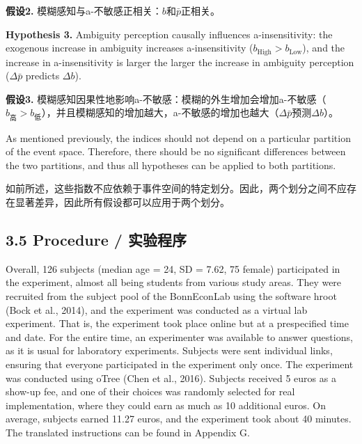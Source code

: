 \documentclass[12pt,a4paper]{article}
\newenvironment{original}
  {\par\medskip\noindent\color{black}\ignorespaces}
  {\par\medskip}
\newenvironment{translation}
  {\par\noindent\color{transblue}\ignorespaces}
  {\par\medskip\medskip}
\begin{document}
\begin{translation}
\textbf{假设2.} 模糊感知与a-不敏感正相关：$b$和$\bar{p}$正相关。
\end{translation}

\begin{original}
\textbf{Hypothesis 3.} Ambiguity perception causally influences a-insensitivity: the exogenous increase in ambiguity increases a-insensitivity ($b_{\text{High}} > b_{\text{Low}}$), and the increase in a-insensitivity is larger the larger the increase in ambiguity perception ($\Delta \bar{p}$ predicts $\Delta b$).
\end{original}

\begin{translation}
\textbf{假设3.} 模糊感知因果性地影响a-不敏感：模糊的外生增加会增加a-不敏感（$b_{\text{高}} > b_{\text{低}}$），并且模糊感知的增加越大，a-不敏感的增加也越大（$\Delta \bar{p}$预测$\Delta b$）。
\end{translation}

\begin{original}
As mentioned previously, the indices should not depend on a particular partition of the event space. Therefore, there should be no significant differences between the two partitions, and thus all hypotheses can be applied to both partitions.
\end{original}

\begin{translation}
如前所述，这些指数不应依赖于事件空间的特定划分。因此，两个划分之间不应存在显著差异，因此所有假设都可以应用于两个划分。
\end{translation}

\subsection{3.5 Procedure / 实验程序}

\begin{original}
Overall, 126 subjects (median age = 24, SD = 7.62, 75 female) participated in the experiment, almost all being students from various study areas. They were recruited from the subject pool of the BonnEconLab using the software hroot (Bock et al., 2014), and the experiment was conducted as a virtual lab experiment. That is, the experiment took place online but at a prespecified time and date. For the entire time, an experimenter was available to answer questions, as it is usual for laboratory experiments. Subjects were sent individual links, ensuring that everyone participated in the experiment only once. The experiment was conducted using oTree (Chen et al., 2016). Subjects received 5 euros as a show-up fee, and one of their choices was randomly selected for real implementation, where they could earn as much as 10 additional euros. On average, subjects earned 11.27 euros, and the experiment took about 40 minutes. The translated instructions can be found in Appendix G.
\end{original}
\end{document}
